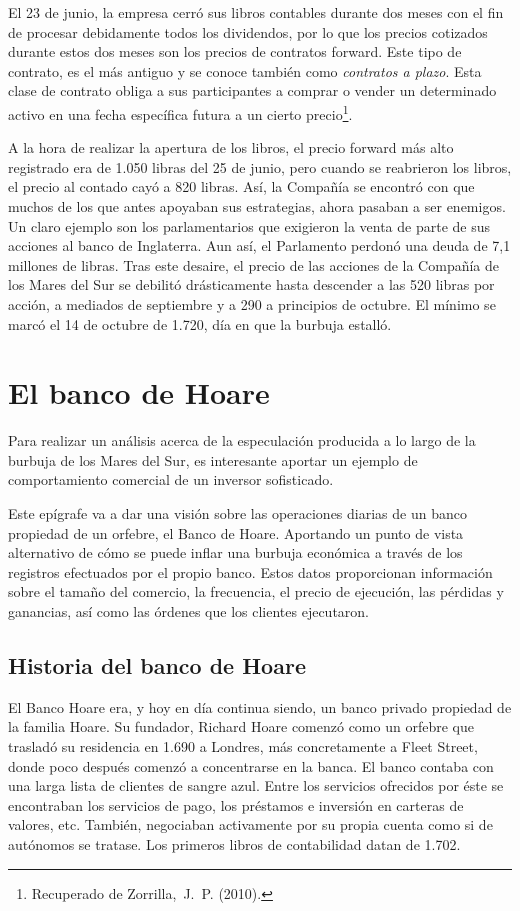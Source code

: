 El 23 de junio, la empresa cerró sus libros contables durante dos meses con el fin de procesar debidamente todos los dividendos, por lo que los precios cotizados durante estos dos meses son los precios de contratos forward. Este tipo de contrato, es el más antiguo y se conoce también como \emph{contratos a plazo}. Esta clase de contrato obliga a sus participantes a comprar o vender un determinado activo en una fecha específica futura a un cierto precio\footnote{Recuperado de Zorrilla, J. P. (2010).}.

A la hora de realizar la apertura de los libros, el precio forward más alto registrado era de 1.050 libras del 25 de junio, pero cuando se reabrieron los libros, el precio al contado cayó a 820 libras. Así, la Compañía se encontró con que muchos de los que antes apoyaban sus estrategias, ahora pasaban a ser enemigos. Un claro ejemplo son los parlamentarios que exigieron la venta de parte de sus acciones al banco de Inglaterra. Aun así, el Parlamento perdonó una deuda de 7,1 millones de libras. 
Tras este desaire, el precio de las acciones de la Compañía de los Mares del Sur se debilitó drásticamente hasta descender a las 520 libras por acción, a mediados de septiembre y a 290 a principios de octubre. El mínimo se marcó el 14 de octubre de 1.720, día en que la burbuja estalló. 

\section{El banco de Hoare}
Para realizar un análisis acerca de la especulación producida a lo largo de la burbuja de los Mares del Sur, es interesante aportar un ejemplo de comportamiento comercial de un inversor sofisticado.

Este epígrafe va a dar una visión sobre las operaciones diarias de un banco propiedad de un orfebre, el Banco de Hoare. Aportando un punto de vista alternativo de cómo se puede inflar una burbuja económica a través de los registros efectuados por el propio banco. Estos datos proporcionan información sobre el tamaño del comercio, la frecuencia, el precio de ejecución, las pérdidas y ganancias, así como las órdenes que los clientes ejecutaron. 

\subsection{Historia del banco de Hoare}

El Banco Hoare era, y hoy en día continua siendo, un banco privado propiedad de la familia Hoare. Su fundador, Richard Hoare comenzó como un orfebre que trasladó su residencia en 1.690 a Londres, más concretamente a Fleet Street, donde poco después comenzó a concentrarse en la banca. El banco contaba con una larga lista de clientes de sangre azul. Entre los servicios ofrecidos por éste se encontraban los servicios de pago, los préstamos e inversión en carteras de valores, etc. También, negociaban activamente por su propia cuenta como si de autónomos se tratase. Los primeros libros de contabilidad datan de 1.702.

